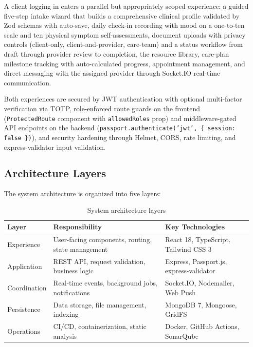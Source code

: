 \documentclass[12pt,letterpaper]{article}
\begin{document}
A client logging in enters a parallel but appropriately scoped experience: a guided five-step intake wizard that builds a comprehensive clinical profile validated by Zod schemas with auto-save, daily check-in recording with mood on a one-to-ten scale and ten physical symptom self-assessments, document uploads with privacy controls (client-only, client-and-provider, care-team) and a status workflow from draft through provider review to completion, the resource library, care-plan milestone tracking with auto-calculated progress, appointment management, and direct messaging with the assigned provider through Socket.IO real-time communication.

Both experiences are secured by JWT authentication with optional multi-factor verification via TOTP, role-enforced route guards on the frontend (\texttt{ProtectedRoute} component with \texttt{allowedRoles} prop) and middleware-gated API endpoints on the backend (\texttt{passport.authenticate('jwt', \{ session: false \})}), and security hardening through Helmet, CORS, rate limiting, and express-validator input validation.

\subsection{Architecture Layers}

The system architecture is organized into five layers:

\begin{table}[H]
\centering
\small
\begin{tabularx}{\textwidth}{|>{\raggedright\arraybackslash}p{2.5cm}|>{\raggedright\arraybackslash}X|>{\raggedright\arraybackslash}p{4cm}|}
\hline
\rowcolor{TableHeader}\textcolor{TableHeaderText}{\textbf{Layer}} & \textcolor{TableHeaderText}{\textbf{Responsibility}} & \textcolor{TableHeaderText}{\textbf{Key Technologies}} \\
\hline
Experience & User-facing components, routing, state management & React 18, TypeScript, Tailwind CSS 3 \\
\hline
\rowcolor{TableRowAlt}
Application & REST API, request validation, business logic & Express, Passport.js, express-validator \\
\hline
Coordination & Real-time events, background jobs, notifications & Socket.IO, Nodemailer, Web Push \\
\hline
\rowcolor{TableRowAlt}
Persistence & Data storage, file management, indexing & MongoDB 7, Mongoose, GridFS \\
\hline
Operations & CI/CD, containerization, static analysis & Docker, GitHub Actions, SonarQube \\
\hline
\end{tabularx}
\caption{System architecture layers}
\end{table}
\end{document}
